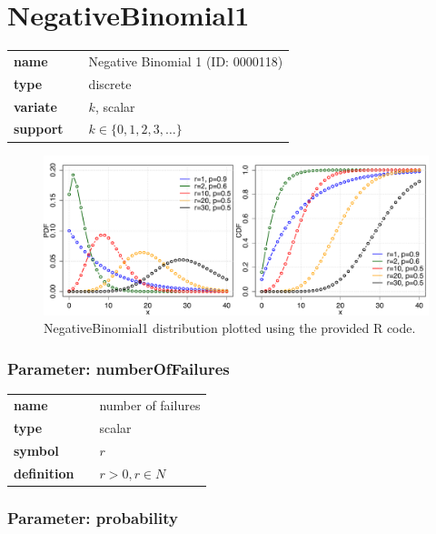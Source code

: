 \section*{NegativeBinomial1} 

  \bigskip 

\begin{tabular}{p{2cm}cl}
\textbf{name} & & Negative Binomial 1 (ID: 0000118)\\ 
 
\textbf{type} & & discrete \\ 

\textbf{variate} & & $k$, scalar \\ 

\textbf{support} & & $k \in \{0,1,2,3,\dots\}$
\end{tabular}

\begin{figure}[ht!]
\centering
  \includegraphics[width=140mm]{pics/NegativeBinomial1.pdf}
 \caption{NegativeBinomial1 distribution plotted using the provided R code.}
 \label{fig:NegativeBinomial1}
\end{figure}

\subsubsection*{Parameter: numberOfFailures}

\noindent\begin{tabular}{p{2cm}cl}
\textbf{name} & & number of failures \\
\textbf{type} & & scalar \\
\textbf{symbol} & & $r$  \\
\textbf{definition} & & $r > 0, r \in N$
\end{tabular}
\subsubsection*{Parameter: probability}

